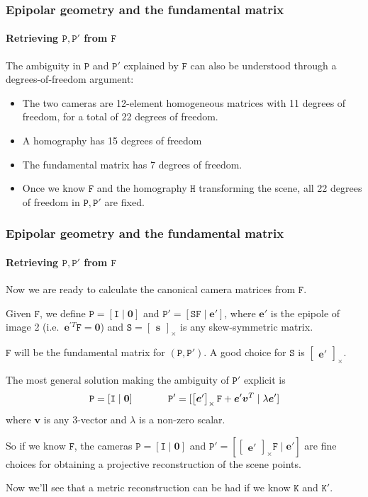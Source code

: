 \documentclass[aspectratio=169]{beamer}
\renewcommand{\vec}[1]{\boldsymbol{#1}}
\newcommand{\mat}[1]{\mathtt{#1}}
\newcommand{\crossmat}[1]{\begin{bmatrix} #1 \end{bmatrix}_{\times}}
\begin{document}
\begin{frame}
\frametitle{Epipolar geometry and the fundamental matrix}
\framesubtitle{Retrieving $\mat{P},\mat{P}'$ from $\mat{F}$}

The ambiguity in $\mat{P}$ and $\mat{P}'$ explained by $\mat{F}$ can
also be understood through a degrees-of-freedom argument:
\begin{itemize}
\item The two cameras are 12-element homogeneous matrices with 11
  degrees of freedom, for a total of 22 degrees of freedom.
\item A homography has 15 degrees of freedom
\item The fundamental matrix has 7 degrees of freedom.
\item Once we know $\mat{F}$ and the homography $\mat{H}$ transforming
  the scene, all 22 degrees of freedom in $\mat{P},\mat{P}'$ are fixed. 
\end{itemize}

\end{frame}

\begin{frame}
\frametitle{Epipolar geometry and the fundamental matrix}
\framesubtitle{Retrieving $\mat{P},\mat{P}'$ from $\mat{F}$}

Now we are ready to calculate the canonical camera matrices from
$\mat{F}$.

\medskip

Given $\mat{F}$, we define $\mat{P}=[\mat{I}\mid \vec{0}]$ and
$\mat{P}'=[\mat{S}\mat{F}\mid\vec{e}']$, where $\vec{e}'$ is the
epipole of image 2 (i.e.\ $\vec{e}^{\prime T}\mat{F}=\vec{0}$) and
$\mat{S}=\crossmat{\vec{s}}$ is any skew-symmetric matrix.

\medskip

$\mat{F}$ will be the fundamental matrix for $(\mat{P},\mat{P}')$.  A
good choice for $\mat{S}$ is $\crossmat{\vec{e}'}$.

\medskip

The \alert{most general} solution making the ambiguity of $\mat{P}'$
explicit is
\begin{equation*}
\mat{P}=[\mat{I}\mid\vec{0}]  \hspace{0.5in}
\mat{P}'=[\crossmat{\vec{e}'}\mat{F}+\vec{e}'\vec{v}^T\mid\lambda\vec{e}']
\end{equation*}
where $\vec{v}$ is any 3-vector and $\lambda$ is a non-zero scalar.

\medskip

So \alert{if we know $\mat{F}$}, the cameras $\mat{P} = [\mat{I} \mid
\vec{0}]$ and $\mat{P}' = [\crossmat{\vec{e}'}\mat{F} \mid \vec{e}']$
are fine choices for obtaining
a \alert{projective} reconstruction of the scene
points.

\medskip

Now we'll see that a \alert{metric} reconstruction can be had if we
know $\mat{K}$ and $\mat{K}'$.

\end{frame}
\end{document}
